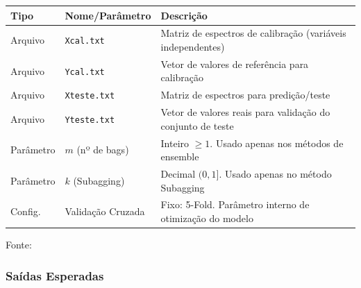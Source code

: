 \begin{quadro}[ht]
\begin{center}
\small
\captionsetup{justification=centering, labelsep=endash, width=0.75\linewidth}
\caption{Entradas necessárias para execução do sistema}
\label{quadro:entradas}
\begin{threeparttable}
\begin{tabularx}{\textwidth}{|l|X|X|} \hline
\textbf{Tipo} & \textbf{Nome/Parâmetro} & \textbf{Descrição} \\ \hline
Arquivo & \texttt{Xcal.txt} & Matriz de espectros de calibração (variáveis independentes) \\ \hline
Arquivo & \texttt{Ycal.txt} & Vetor de valores de referência para calibração \\ \hline
Arquivo & \texttt{Xteste.txt} & Matriz de espectros para predição/teste \\ \hline
Arquivo & \texttt{Yteste.txt} & Vetor de valores reais para validação do conjunto de teste \\ \hline
Parâmetro & $m$ (nº de bags) & Inteiro $\geq 1$. Usado apenas nos métodos de ensemble \\ \hline
Parâmetro & $k$ (Subagging) & Decimal $(0, 1]$. Usado apenas no método Subagging \\ \hline
Config. & Validação Cruzada & Fixo: 5-Fold. Parâmetro interno de otimização do modelo \\ \hline
\end{tabularx}
\begin{tablenotes}[flushleft]
\footnotesize
\item Fonte:~\oautor
\end{tablenotes}
\end{threeparttable}
\end{center}
\end{quadro}

\subsubsection{Saídas Esperadas}
\label{ssubsec:saidas}

